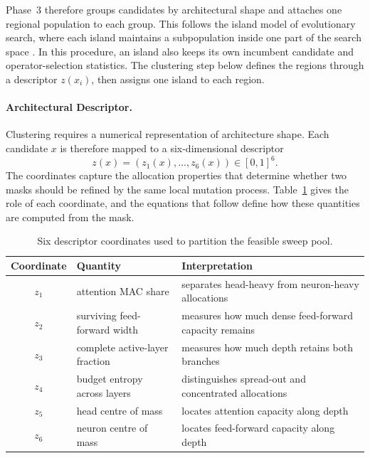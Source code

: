 Phase~3 therefore groups candidates by architectural shape and attaches one regional population to each group. This follows the island model of evolutionary search, where each island maintains a subpopulation inside one part of the search space \citep{cantupaz2000efficient}. In this procedure, an island also keeps its own incumbent candidate and operator-selection statistics. The clustering step below defines the regions through a descriptor $z(x_i)$, then assigns one island to each region.

\paragraph{Architectural Descriptor.}
Clustering requires a numerical representation of architecture shape. Each candidate $x$ is therefore mapped to a six-dimensional descriptor
\[
z(x)=(z_1(x),\ldots,z_6(x))\in[0,1]^6 .
\]
The coordinates capture the allocation properties that determine whether two masks should be refined by the same local mutation process. Table~\ref{tab:cvt_descriptor} gives the role of each coordinate, and the equations that follow define how these quantities are computed from the mask.

\begin{table}[H]
\centering
\footnotesize
\setlength{\tabcolsep}{4pt}
\begin{tabularx}{0.92\textwidth}{c l X}
\toprule
Coordinate & Quantity & Interpretation \\
\midrule
$z_1$ & attention MAC share & separates head-heavy from neuron-heavy allocations \\
$z_2$ & surviving feed-forward width & measures how much dense feed-forward capacity remains \\
$z_3$ & complete active-layer fraction & measures how much depth retains both branches \\
$z_4$ & budget entropy across layers & distinguishes spread-out and concentrated allocations \\
$z_5$ & head centre of mass & locates attention capacity along depth \\
$z_6$ & neuron centre of mass & locates feed-forward capacity along depth \\
\bottomrule
\end{tabularx}
\caption{Six descriptor coordinates used to partition the feasible sweep pool.}
\label{tab:cvt_descriptor}
\end{table}

